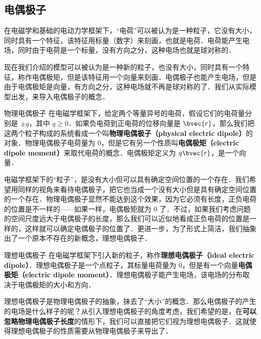 


\subsection{电偶极子}

在电磁学和基础的电动力学框架下，“电荷”可以被认为是一种粒子，它没有大小，同时具有一个特征，该特征用标量（数字）来刻画，也就是电荷．电荷能产生电场，同时由于电荷是一个标量，没有方向之分，这种电场也就是球对称的．

现在我们介绍的模型可以被认为是一种新的粒子，也没有大小，同时具有一个特征，称作电偶极矩，但是该特征用一个向量来刻画．电偶极子也能产生电场，但是由于电偶极矩是向量，有方向之分，这种电场就不再是球对称的了．我们从实际模型出发，来导入电偶极子的概念．

\begin{definition}{物理电偶极子}
在电磁学框架下，给定两个等量异号的电荷，假设它们的电荷量分别是 $\pm q$，其中 $q\geq 0$．如果负电荷到正电荷的位移向量是 $\bvec{r}$，那么我们把这两个粒子构成的系统看成一个叫\textbf{物理电偶极子（physical electric dipole）}的对象．物理电偶极子电荷量为 $0$，但是它有另一个性质叫\textbf{电偶极矩（electric dipole moment）}来取代电荷的概念．电偶极矩定义为 $q\bvec{r}$，是一个向量．
\end{definition}

电磁学框架下的“粒子”，是没有大小但可以具有确定空间位置的一个存在．我们希望用同样的视角来看待电偶极子，把它也当成一个没有大小但是具有确定空间位置的一个存在．物理电偶极子显然不能达到这个效果，因为它必须有长度，正负电荷的位置是不一样的——如果一样，电偶极矩就为 $0$ 了．不过，如果我们考虑问题的空间尺度远大于电偶极子的长度，那么我们可以近似地看成正负电荷的位置是一样的，这样就可以确定电偶极子的位置了．更进一步，为了形式上简洁，我们抽象出了一个原本不存在的新概念，理想电偶极子．

\begin{definition}{理想电偶极子}
在电磁学框架下引入新的粒子，称作\textbf{理想电偶极子（ideal electric dipole）}．理想电偶极子是一个点粒子，其标量电荷量为 $0$，但是有一个向量\textbf{电偶极矩（electric dipole moment）}．理想电偶极子能产生电场，该电场的分布取决于电偶极矩的大小和方向．
\end{definition}

理想电偶极子是物理电偶极子的抽象，抹去了“大小”的概念．那么电偶极子的产生的电场是什么样子的呢？从引入理想电偶极子的角度考虑，我们希望的是，在\textbf{可以忽略物理电偶极子长度}的情形下，我们可以直接把它们视为理想电偶极子．这就使得理想电偶极子的性质需要从物理电偶极子来导出了．

